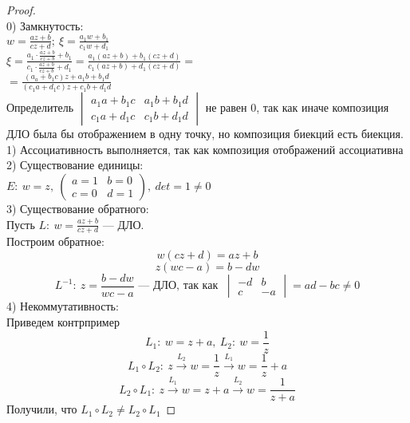 \begin{proof}
    \ \\
    0) Замкнутость:\\
    $w=\frac{az+b}{cz+d}; \ \xi=\frac{a_1w+b_1}{c_1w+d_1}$\\[2mm]
    $\xi=\frac{a_1\cdot\frac{az+b}{cz+b}+b_1}{c_1\cdot\frac{az+b}{cz+b}+d_1} =\frac{a_1(az+b)+b_1(cz+d)}{c_1(az+b)+d_1(cz+d)}=$\\
    $= \frac{(a_a+b_1c)z+a_1b+b_1d}{(c_1a+d_1c)z+c_1b+d_1d}$\\[2mm]
    Определитель $\begin{vmatrix}
        a_1a+b_1c & a_1b+b_1d\\
        c_1a+d_1c & c_1b+d_1d
    \end{vmatrix}$ не равен 0, так как иначе композиция ДЛО была бы отображением в одну точку, но композиция биекций есть биекция.\\[2mm]
    1) Ассоциативность выполняется, так как композиция отображений ассоциативна\\[2mm]
    2) Существование единицы:\\
    $E: \ w=z, \ \begin{pmatrix} a=1&b=0\\c=0&d=1\end{pmatrix}, \ det = 1\neq0$\\[2mm]
    3) Существование обратного:\\
    Пусть $L: \ w=\frac{az+b}{cz+d}$ --- ДЛО.\\
    Построим обратное:
    $$w(cz+d)=az+b$$
    $$z(wc-a)=b-dw$$
    $$L^{-1}: \ z=\frac{b-dw}{wc-a} \text{ --- ДЛО, так как } \ \begin{vmatrix}-d&b\\c&-a\end{vmatrix}=ad-bc\neq0$$ 
    4) Некоммутативность:\\
    Приведем контрпример
    $$L_1: \ w=z+a, \ L_2: \ w=\frac{1}{z}$$
    $$L_1\circ L_2: \ z \overset{L_2}{\rightarrow} w=\frac{1}{z} \overset{L_1}{\rightarrow} w = \frac{1}{z}+a$$
    $$L_2 \circ L_1: \ z \overset{L_1}{\rightarrow} w = z+a \overset{L_2}{\rightarrow} w = \frac{1}{z+a}$$
    Получили, что $L_1\circ L_2 \neq L_2 \circ L_1$
\end{proof}
